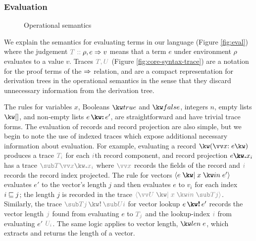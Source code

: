 \subsubsection{Evaluation}
\label{sec:core-language:eval}

\begin{figure}
   
   
   
   \caption{Operational semantics}
   \label{fig:core-language:semantics}
\end{figure}



We explain the semantics for evaluating terms in our language (Figure \ref{fig:eval}) where the judgement $\explVal{T}{\rho, e \evalR v}$ means that a term $e$ under environment $\rho$ evaluates to a value $v$. Traces $\textcolor{gray}{T, U}$ (Figure \ref{fig:core-syntax-trace}) are a notation for the proof terms of the $\Rightarrow$ relation, and are a compact representation for derivation trees in the operational semantics in the sense that they discard unnecessary information from the derivation tree.

The rules for variables $x$, Booleans $\exTrue$ and $\exFalse$, integers $n$, empty lists $\exNil$, and non-empty lists $\exCons{e}{e'}$, are straightforward and have trivial trace forms. The evaluation of records and record projection are also simple, but we begin to note the use of indexed traces which expose additional necessary information about evaluation. For example, evaluating a record $\exRec{\vec{\bind{x}{e}}}$ produces a trace $\textcolor{gray}{T_i}$ for each $\textcolor{gray}{i}$th record component, and record projection $\exRecProj{e}{x_i}$ has a trace $\textcolor{gray}{\trRecProj{T}{\vec{x}}{x_i}}$ where $\textcolor{gray}{\vec{x}}$ records the fields of the record and $\textcolor{gray}{i}$ records the record index projected. The rule for vectors $\exVec{e}{x}{e'}$ evaluates $e'$ to the vector's length $j$ and then evaluates $e$ to $v_i$ for each index $i \numleq j$; the length $j$ is recorded in the trace $\textcolor{gray}{\trVec{\vec{U}}{x}{T}{j}}$. Similarly, the trace $\textcolor{gray}{\trVecLookup{T}{j}{U}{i}}$ for vector lookup $\exVecLookup{e}{e'}$ records the vector length $\textcolor{gray}{j}$ found from evaluating $e$ to $\textcolor{gray}{T_j}$ and the lookup-index $\textcolor{gray}{i}$ from evaluating $e'$ $\textcolor{gray}{U_i}$. The same logic applies to vector length, $\exVecLen{e}$, which extracts and returns the length of a vector.

